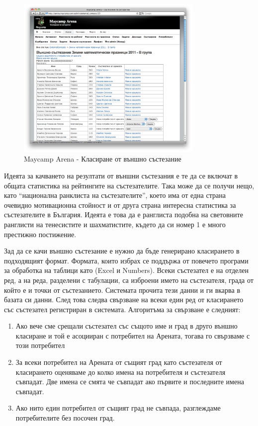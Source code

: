 \documentclass[a4paper,12pt]{article}
\begin{document}
  \begin{figure}[ht]
    \begin{center}
      \includegraphics[width=0.8\textwidth]{images/maycamp_arena_external_ranklist.png}
    \end{center}
    \caption{Maycamp Arena - Класиране от външно състезание}
    \label{arena_external_ranklist}
  \end{figure}
  
  Идеята за качването на резултати от външни състезания е те да се включат в общата статистика на рейтингите на състезателите. Така може да се получи нещо, като ``национална ранклиста на състезателите'', което има от една страна очевидно мотивационна стойност и от друга страна интересна статистика за състезателите в България. Идеята е това да е ранглиста подобна на световните ранглисти на тенесистите и шахматистите, където да си номер 1 е много престижно постижение.
  
  Зад да се качи външно състезание е нужно да бъде генерирано класирането в подходящият формат. Формата, които избрах се поддържа от повечето програми за обработка на таблици като (Excel и Numbers). Всеки състезател е на отделен ред, а на реда, разделени с табулации, са изброени името на състезателя, града от който е и точки от състезанието. Системата прочита тези данни и ги вкарва в базата си данни. След това следва свързване на всеки един ред от класирането със състезател регистриран в системата. Алгоритъма за свързване е следният:
  
  \begin{enumerate}
    \item Ако вече сме срещали състезател със същото име и град в друго външно класиране и той е асоцииран с потребител на Арената, тогава го свързваме с този потребител
    \item За всеки потребител на Арената от същият град като състезателя от класирането оценяваме до колко имена на потребителя и състезателя съвпадат. Две имена се смята че съвпадат ако първите и последните имена съвпадат.
    \item Ако нито един потребител от същият град не съвпада, разглеждаме потребителите без посочен град.
  \end{enumerate}
  
\end{document}
